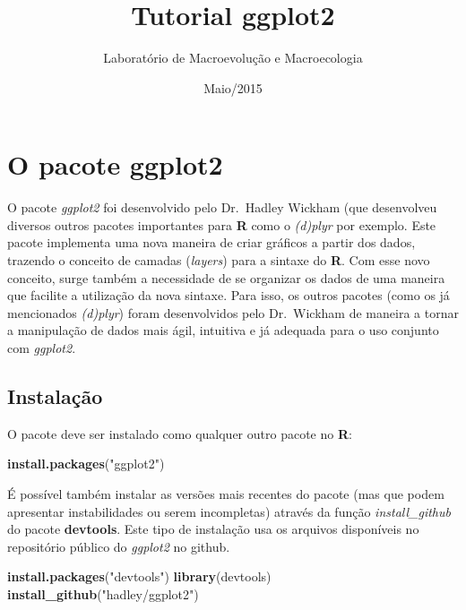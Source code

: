 \documentclass[]{article}
\title{Tutorial ggplot2}
\author{Laboratório de Macroevolução e Macroecologia}
\date{Maio/2015}
\newenvironment{Shaded}{\begin{snugshade}}{\end{snugshade}}
\newcommand{\KeywordTok}[1]{\textcolor[rgb]{0.13,0.29,0.53}{\textbf{{#1}}}}
\newcommand{\StringTok}[1]{\textcolor[rgb]{0.31,0.60,0.02}{{#1}}}
\newcommand{\NormalTok}[1]{{#1}}
\begin{document}
\maketitle


{
\hypersetup{linkcolor=black}
\setcounter{tocdepth}{3}
\tableofcontents
}
\newpage

\section{O pacote ggplot2}\label{o-pacote-ggplot2}

O pacote \emph{ggplot2} foi desenvolvido pelo Dr.~Hadley Wickham (que
desenvolveu diversos outros pacotes importantes para \textbf{R} como o
\emph{(d)plyr} por exemplo. Este pacote implementa uma nova maneira de
criar gráficos a partir dos dados, trazendo o conceito de camadas
(\emph{layers}) para a sintaxe do \textbf{R}. Com esse novo conceito,
surge também a necessidade de se organizar os dados de uma maneira que
facilite a utilização da nova sintaxe. Para isso, os outros pacotes
(como os já mencionados \emph{(d)plyr}) foram desenvolvidos pelo
Dr.~Wickham de maneira a tornar a manipulação de dados mais ágil,
intuitiva e já adequada para o uso conjunto com \emph{ggplot2}.

\subsection{Instalação}\label{instalacao}

O pacote deve ser instalado como qualquer outro pacote no \textbf{R}:

\begin{Shaded}
\begin{Highlighting}[]
\KeywordTok{install.packages}\NormalTok{(}\StringTok{"ggplot2"}\NormalTok{)}
\end{Highlighting}
\end{Shaded}

É possível também instalar as versões mais recentes do pacote (mas que
podem apresentar instabilidades ou serem incompletas) através da função
\emph{install\_github} do pacote \textbf{devtools}. Este tipo de
instalação usa os arquivos disponíveis no repositório público do
\emph{ggplot2} no github.

\begin{Shaded}
\begin{Highlighting}[]
\KeywordTok{install.packages}\NormalTok{(}\StringTok{"devtools"}\NormalTok{)}
\KeywordTok{library}\NormalTok{(devtools)}
\KeywordTok{install_github}\NormalTok{(}\StringTok{"hadley/ggplot2"}\NormalTok{)}
\end{Highlighting}
\end{Shaded}
\end{document}

